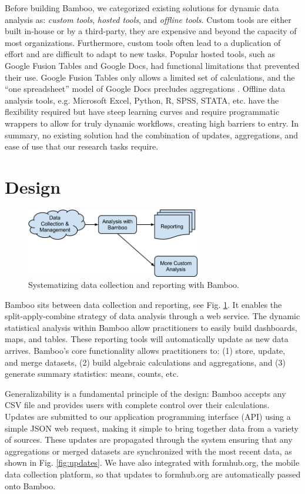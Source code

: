 \documentclass{sig-alternate}
\begin{document}
Before building Bamboo, we categorized existing solutions for dynamic data
analysis as: \emph{custom tools}, \emph{hosted tools}, and \emph{offline tools}.  Custom tools are
either built in-house or by a third-party, they are expensive and beyond the
capacity of most organizations. Furthermore, custom tools often lead to
a duplication of effort and are difficult to adapt to new tasks.  Popular hosted
tools, such as Google Fusion Tables and Google Docs, had functional limitations
that prevented their use.  Google Fusion Tables only allows a limited set of
calculations, and the ``one spreadsheet'' model of Google Docs precludes
aggregations \cite{gonzalez2}.  Offline data analysis tools, e.g. Microsoft Excel, Python, R, SPSS, STATA, etc. have the flexibility required but have steep learning curves and require programmatic wrappers to allow for truly dynamic workflows, creating high barriers to entry.
In summary, no existing solution had the combination of updates, aggregations,
and ease of use that our research tasks require.

\section{Design}

\begin{figure}
\centering
\includegraphics[width=3in]{figures/bamboo_flow}
\caption{Systematizing data collection and reporting with Bamboo.}
\label{fig:flow}
\end{figure}

Bamboo sits between data collection and reporting, see Fig. \ref{fig:flow}. It
enables the split-apply-combine strategy of data analysis
\cite{wickham} through a web service.
The dynamic statistical analysis within Bamboo allow practitioners to easily build
dashboards, maps, and tables.  These reporting tools will automatically update as new data
arrives.    
Bamboo's core functionality allows
practitioners to: (1) store, update, and merge datasets, (2) build algebraic
calculations and aggregations, and (3) generate summary statistics: means, counts, etc.

Generalizability is a fundamental principle of the design: Bamboo accepts any
CSV file and provides users with complete control over their calculations.
Updates are submitted to our application programming interface (API) using a simple JSON web request, making it
simple to bring together data from a variety of sources.
These updates are propagated through the system ensuring that any aggregations or merged datasets are synchronized with the most recent data, as shown in Fig. \ref{fig:updates}.  
We have also integrated with formhub.org, the mobile data collection platform,
so that updates to formhub.org are automatically passed onto Bamboo.
\end{document}
